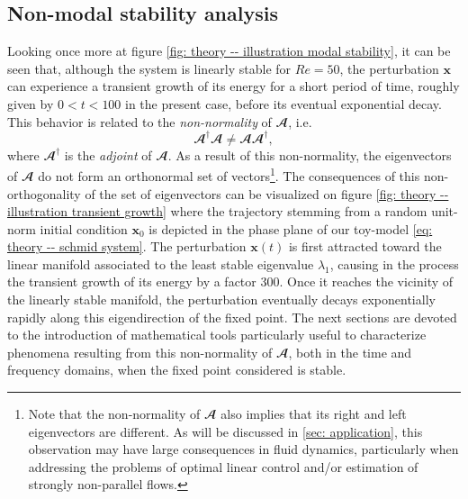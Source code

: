 
  \subsection{Non-modal stability analysis}
  \label{subsec: theory -- non-modal stability}

  Looking once more at figure \ref{fig: theory -- illustration modal stability}, it can be seen that, although the system is linearly stable for $Re=50$, the perturbation $\mathbf{x}$ can experience a transient growth of its energy for a short period of time, roughly given by $0 < t <100$ in the present case, before its eventual exponential decay. This behavior is related to the \emph{non-normality} of $\mathbfcal{A}$, i.e.\
  \begin{equation}
    \mathbfcal{A}^{\dagger} \mathbfcal{A} \neq \mathbfcal{A} \mathbfcal{A}^{\dagger},
    \label{eq: theory -- non-normality equation}
  \end{equation}
  where $\mathbfcal{A}^{\dagger}$ is the \emph{adjoint} of $\mathbfcal{A}$. As a result of this non-normality, the eigenvectors of $\mathbfcal{A}$ do not form an orthonormal set of vectors\footnote{Note that the non-normality of $\mathbfcal{A}$ also implies that its right and left eigenvectors are different. As will be discussed in \textsection \ref{sec: application}, this observation may have large consequences in fluid dynamics, particularly when addressing the problems of optimal linear control and/or estimation of strongly non-parallel flows.}. The consequences of this non-orthogonality of the set of eigenvectors can be visualized on figure \ref{fig: theory -- illustration transient growth} where the trajectory stemming from a random unit-norm initial condition $\mathbf{x}_0$ is depicted in the phase plane of our toy-model \eqref{eq: theory -- schmid system}. The perturbation $\mathbf{x}(t)$ is first attracted toward the linear manifold associated to the least stable eigenvalue $\lambda_1$, causing in the process the transient growth of its energy by a factor 300. Once it reaches the vicinity of the linearly stable manifold, the perturbation eventually decays exponentially rapidly along this eigendirection of the fixed point. The next sections are devoted to the introduction of mathematical tools particularly useful to characterize phenomena resulting from this non-normality of $\mathbfcal{A}$, both in the time and frequency domains, when the fixed point considered is stable.

